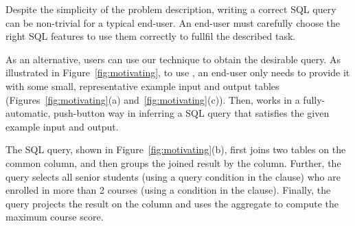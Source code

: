 Despite the simplicity of the problem description,
writing a correct SQL query  can be non-trivial for a typical
end-user. An end-user must carefully choose the
right SQL features to use them correctly
to fullfil the described task.

As an alternative, users can use our \ourtool technique to obtain
the desirable query.
As illustrated in Figure~\ref{fig:motivating},
to use \ourtool, an end-user only needs to provide it with
some small, representative example input and output tables
(Figures~\ref{fig:motivating}(a) and~\ref{fig:motivating}(c)).
Then, \ourtool works in a fully-automatic, push-button
way in inferring a SQL query that satisfies the given
example input and output.


The SQL query, shown in Figure~\ref{fig:motivating}(b),
first joins two tables on the common  column,
and then groups the joined result by the 
column. Further, the query selects all senior
students (using a query condition in the 
clause) who are enrolled in more than 2 courses
(using a condition in the  clause).
Finally, the query projects the result on the
 column and uses the  aggregate
to compute the maximum course score.







